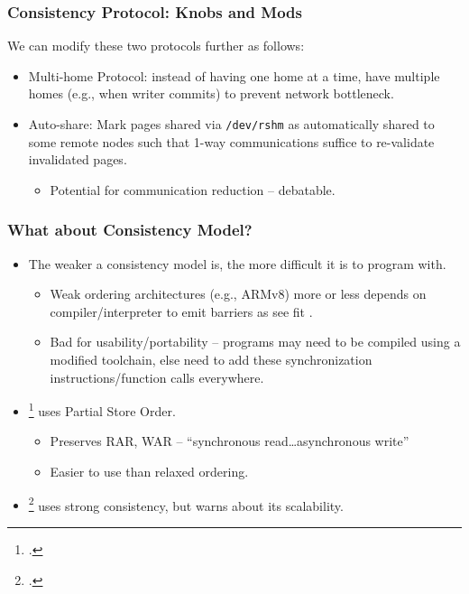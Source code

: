 \documentclass{beamer}
\begin{document}
\begin{frame}
    \frametitle{Consistency Protocol: Knobs and Mods}
    We can modify these two protocols further as follows:
    \begin{itemize}
        \item {
            Multi-home Protocol: instead of having one home at a time, have
            multiple homes (e.g., when writer commits) to prevent network bottleneck.
        }
        \item {
            Auto-share: Mark pages shared via \texttt{/dev/rshm} as automatically
            shared to some remote nodes such that 1-way communications suffice to
            re-validate invalidated pages.
            \begin{itemize}
                \item Potential for communication reduction -- debatable.
            \end{itemize}
        }
    \end{itemize}
\end{frame}

\begin{frame}
    \frametitle{What about Consistency \textbf{Model}?}
    \begin{itemize}
        \item {
            The weaker a consistency model is, the more difficult it is to program with.
            \begin{itemize}
                \item {
                    Weak ordering architectures (e.g., ARMv8) more or less depends on
                    compiler/interpreter to emit barriers as see fit \cite{Haynes_2022}.
                }
                \item {
                    Bad for usability/portability -- programs may need
                    to be compiled using a modified toolchain, else need to add these
                    synchronization instructions/function calls everywhere.
                }
            \end{itemize}
        }
        \item {
            \footcite{cai2018efficient} uses Partial Store Order.
            \begin{itemize}
                \item Preserves RAR, WAR -- ``synchronous read\dots asynchronous write''
                \item Easier to use than relaxed ordering.
            \end{itemize}
        }
        \item {
            \footcite{wang2021concordia} uses strong consistency, but warns about its scalability.
        }
    \end{itemize}
\end{frame}
\end{document}
